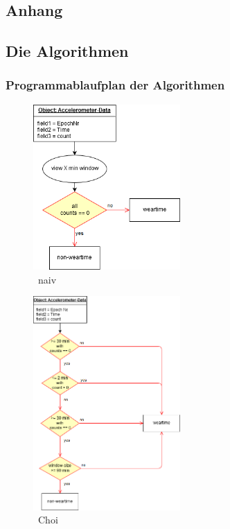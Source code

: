 \begin{appendix}

\chapter{Anhang}

\section{Die Algorithmen}

\subsection{Programmablaufplan der Algorithmen}

\begin{figure}
  \centering
      \includegraphics[width=0.5\textwidth]{Bilder/naiver_ansatz.png}
    \caption{\ naiv}
    \label{flow:naiv}
\end{figure}

\begin{figure}
  \centering
      \includegraphics[width=0.5\textwidth]{Bilder/Choi.png}
    \caption{\ Choi}
    \label{flow:choi}
\end{figure}


\end{appendix}
